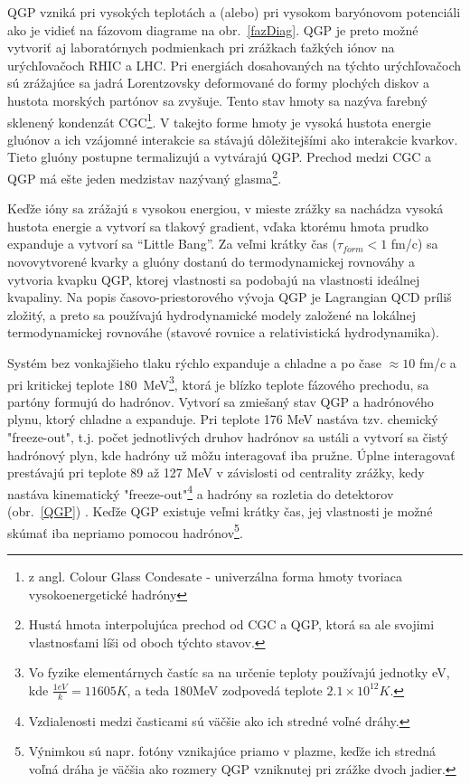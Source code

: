 \documentclass[thesismargins, thesislinespacing]{rnthesis}
\begin{document}
QGP vzniká pri vysokých teplotách a (alebo) pri vysokom baryónovom potenciáli ako je vidieť na fázovom diagrame na obr.~\ref{fazDiag}. QGP je preto možné vytvoriť aj laboratórnych podmienkach pri zrážkach ťažkých iónov na urýchľovačoch RHIC a LHC. Pri energiách dosahovaných na týchto urýchľovačoch sú zrážajúce sa jadrá Lorentzovsky deformované do formy plochých diskov a hustota morských partónov sa zvyšuje. Tento stav hmoty sa nazýva farebný sklenený kondenzát CGC\footnote{z angl. Colour Glass Condesate - univerzálna forma hmoty tvoriaca vysokoenergetické hadróny\cite{hevion}}. V takejto forme hmoty je vysoká hustota energie gluónov a ich vzájomné interakcie sa stávajú dôležitejšími ako interakcie kvarkov. Tieto gluóny postupne termalizujú a vytvárajú QGP. Prechod medzi CGC a QGP má ešte jeden medzistav nazývaný glasma\footnote{Hustá hmota interpolujúca prechod od CGC a QGP, ktorá sa ale svojimi vlastnosťami líši od oboch týchto stavov\cite{hevion}.}\cite{glasma}.

Keďže ióny sa zrážajú s vysokou energiou, v mieste zrážky sa nachádza vysoká hustota energie a vytvorí sa tlakový gradient, vďaka ktorému hmota prudko expanduje a vytvorí sa “Little Bang”. Za veľmi krátky čas ($\tau_{form}<1$ fm/c)  sa novovytvorené kvarky a gluóny dostanú do termodynamickej rovnováhy a vytvoria kvapku QGP, ktorej vlastnosti sa podobajú na vlastnosti ideálnej kvapaliny. Na popis časovo-priestorového vývoja QGP je Lagrangian QCD príliš zložitý, a preto sa používajú hydrodynamické modely založené na lokálnej termodynamickej rovnováhe (stavové rovnice a relativistická hydrodynamika).

Systém bez vonkajšieho tlaku rýchlo expanduje a chladne a po čase $\approx 10$ fm/c a pri kritickej teplote 180~MeV\footnote{Vo fyzike elementárnych častíc sa na určenie teploty používajú jednotky eV, kde $\frac{1eV}{k}= 11605K$, a teda 180MeV zodpovedá teplote $2.1\times10^{12}K$.}, ktorá je blízko teplote fázového prechodu, sa partóny formujú do hadrónov. Vytvorí sa zmiešaný stav QGP a hadrónového plynu, ktorý chladne a expanduje.  Pri teplote 176 MeV\cite{tempr} nastáva tzv. chemický "freeze-out\-", t.j. počet jednotlivých druhov hadrónov sa ustáli a vytvorí sa čistý hadrónový plyn, kde hadróny už môžu interagovať iba pružne. Úplne interagovať prestávajú pri teplote 89 až 127 MeV v závislosti od centrality zrážky\cite{kinfrezze}, kedy nastáva kinematický "freeze-out"\footnote{Vzdialenosti medzi časticami sú väčšie ako ich stredné voľné dráhy. } \-a hadróny sa rozletia do detektorov (obr.~\ref{QGP}) . Keďže QGP existuje veľmi krátky čas, jej vlastnosti je možné skúmať iba nepriamo pomocou hadrónov\footnote{Výnimkou sú napr. fotóny vznikajúce priamo v plazme, keďže ich stredná voľná dráha je väčšia ako rozmery QGP vzniknutej pri zrážke dvoch jadier.}.  
\end{document}
